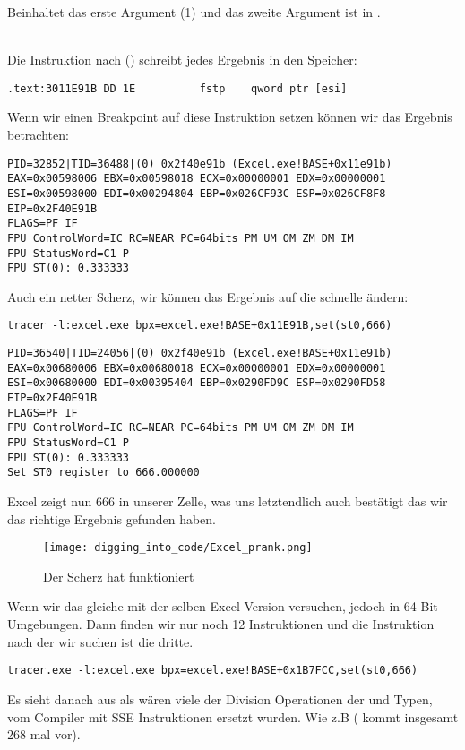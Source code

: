  Beinhaltet das erste Argument (1) und das zweite Argument ist in \TT{[EBX]}.\\
\\

Die Instruktion nach \FDIV () schreibt jedes Ergebnis in den Speicher:\\

\begin{lstlisting}[style=customasmx86]
.text:3011E91B DD 1E          fstp    qword ptr [esi]
\end{lstlisting}

Wenn wir einen Breakpoint auf diese Instruktion setzen können wir das Ergebnis betrachten:

\begin{lstlisting}
PID=32852|TID=36488|(0) 0x2f40e91b (Excel.exe!BASE+0x11e91b)
EAX=0x00598006 EBX=0x00598018 ECX=0x00000001 EDX=0x00000001
ESI=0x00598000 EDI=0x00294804 EBP=0x026CF93C ESP=0x026CF8F8
EIP=0x2F40E91B
FLAGS=PF IF
FPU ControlWord=IC RC=NEAR PC=64bits PM UM OM ZM DM IM 
FPU StatusWord=C1 P 
FPU ST(0): 0.333333
\end{lstlisting}

Auch ein netter Scherz, wir können das Ergebnis auf die schnelle ändern:

\begin{lstlisting}
tracer -l:excel.exe bpx=excel.exe!BASE+0x11E91B,set(st0,666)
\end{lstlisting}

\begin{lstlisting}
PID=36540|TID=24056|(0) 0x2f40e91b (Excel.exe!BASE+0x11e91b)
EAX=0x00680006 EBX=0x00680018 ECX=0x00000001 EDX=0x00000001
ESI=0x00680000 EDI=0x00395404 EBP=0x0290FD9C ESP=0x0290FD58
EIP=0x2F40E91B
FLAGS=PF IF
FPU ControlWord=IC RC=NEAR PC=64bits PM UM OM ZM DM IM 
FPU StatusWord=C1 P 
FPU ST(0): 0.333333
Set ST0 register to 666.000000
\end{lstlisting}

Excel zeigt nun 666 in unserer Zelle, was uns letztendlich auch bestätigt das wir das richtige Ergebnis gefunden haben.

\begin{figure}[H]
\centering
\texttt{[image: digging\_into\_code/Excel\_prank.png]}
\caption{Der Scherz hat funktioniert}
\end{figure}

Wenn wir das gleiche mit der selben Excel Version versuchen, jedoch in 64-Bit Umgebungen.
Dann finden wir nur noch 12 \FDIV Instruktionen und die Instruktion nach der wir suchen ist
die dritte. 

\begin{lstlisting}
tracer.exe -l:excel.exe bpx=excel.exe!BASE+0x1B7FCC,set(st0,666)
\end{lstlisting}


Es sieht danach aus als wären viele der Division Operationen der \Tfloat und \Tdouble Typen, vom Compiler mit SSE Instruktionen ersetzt wurden.
Wie z.B  ( kommt insgesamt 268 mal vor).
